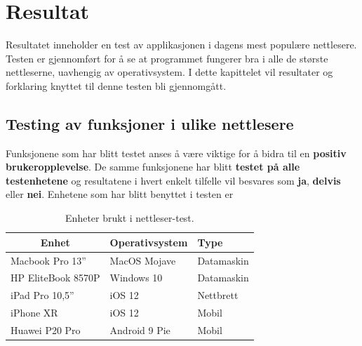 \chapter{Resultat}
\label{resultat} %
Resultatet inneholder en test av applikasjonen i dagens mest populære nettlesere. Testen er gjennomført for å se at programmet fungerer bra i alle de største nettleserne, uavhengig av operativsystem. I dette kapittelet vil resultater og forklaring knyttet til denne testen bli gjennomgått.

\section{Testing av funksjoner i ulike nettlesere}
Funksjonene som har blitt testet anses å være viktige for å bidra til en \textbf{positiv brukeropplevelse}. De samme funksjonene har blitt \textbf{testet på alle testenhetene} og resultatene i hvert enkelt tilfelle vil besvares som \textbf{ja}, \textbf{delvis} eller \textbf{nei}. Enhetene som har blitt benyttet i testen er

\begin{table}[H]
\centering
\begin{tabular}{|l|l|l|}
\hline
\multicolumn{1}{|c|}{\textbf{Enhet}} & \textbf{Operativsystem} & \textbf{Type}\\ \hline
Macbook Pro 13'' & MacOS Mojave & Datamaskin \\ \hline
HP EliteBook 8570P & Windows 10 & Datamaskin\\ \hline
iPad Pro 10,5'' & iOS 12 & Nettbrett\\ \hline
iPhone XR & iOS 12 & Mobil\\ \hline
Huawei P20 Pro & Android 9 Pie & Mobil \\ \hline
\end{tabular}
\caption{Enheter brukt i nettleser-test.}
\end{table}


